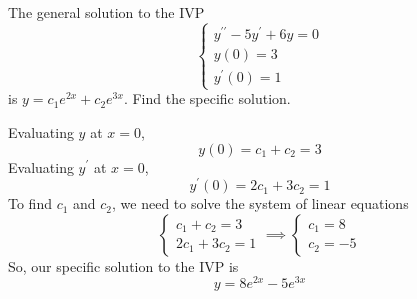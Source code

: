 \begin{example}
	The general solution to the IVP
	\begin{equation*}
		\begin{cases}
			y^{\prime\prime} - 5y^\prime + 6y = 0 \\
			y(0) = 3 \\
			y^\prime(0) = 1
		\end{cases}
	\end{equation*}
	is $y = c_1e^{2x} + c_2e^{3x}$. Find the specific solution.
\end{example}
\noindent
Evaluating $y$ at $x = 0$,
\begin{equation*}
	y(0) = c_1 + c_2 = 3
\end{equation*}
Evaluating $y^\prime$ at $x = 0$,
\begin{equation*}
	y^\prime(0) = 2c_1 + 3c_2 = 1
\end{equation*}
To find $c_1$ and $c_2$, we need to solve the system of linear equations
\begin{equation*}
	\begin{cases}
		c_1 + c_2 = 3 \\
		2c_1 + 3c_2 = 1
	\end{cases} \implies \begin{cases}
		c_1 = 8 \\
		c_2 = -5
	\end{cases}
\end{equation*}
So, our specific solution to the IVP is
\begin{equation*}
	y = 8e^{2x} - 5e^{3x}
\end{equation*}